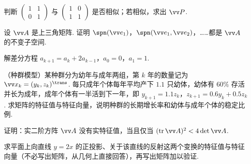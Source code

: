 {\begin{exA}
			\item\label{ex:eig:A15} 判断 $\begin{pmatrix}1&1\\0&1\end{pmatrix}$ 与 $\begin{pmatrix}1&0\\1&1\end{pmatrix}$ 是否相似；若相似，求出 $\vv P$.
			\item\label{ex:eig:A16} 设 $\vv A$ 是上三角矩阵. 证明 $\spn(\vv e_1)$，$\spn(\vv e_1,\vv e_2)$，……都是 $\vv A$ 的不变子空间.
			\item\label{ex:eig:A17} 解差分方程 $a_{k+1}=a_k+2a_{k-1}$，$a_0=0$，$a_1=1$.
			\item\label{ex:eig:A18} （种群模型）某种群分为幼年与成年两组，第 $k$ 年的数量记为 $\vv x_k=(y_k,z_k)^\trans$. 每只成年个体每年平均产下 $1.1$ 只幼体，幼体有 $60\%$ 存活并长为成年，成年个体有一半活到下一年，即
			$y_{k+1}=1.1z_k$，$z_{k+1}=0.6y_k+0.5z_k$. 求矩阵的特征值与特征向量，说明种群的长期增长率和幼体与成年个体的稳定比例.
			\item\label{ex:eig:A19} 证明：实二阶方阵 $\vv A$ 没有实特征值，当且仅当 $(\tr\vv A)^2<4\det\vv A$.
			\item\label{ex:eig:A20} 求平面上向直线 $y=2x$ 的正投影、关于该直线的反射这两个变换的特征值与特征向量（不必写出矩阵，从几何上直接回答），再写出矩阵加以验证.
		\end{exA}
		
}
